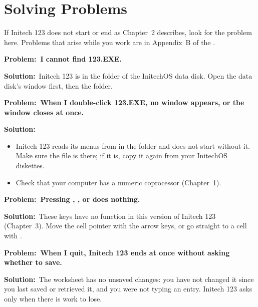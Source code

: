 \chapter{Solving Problems}
\newcommand\Problem[1]{\par\addvspace{8pt}\noindent\textbf{Problem:\ #1}\par\nobreak\vspace{2pt}}
\newcommand\Solution{\noindent\textbf{Solution:}\ }

If Initech 123 does not start or end as Chapter~2 describes, look for the problem
here.  Problems that arise while you work are in Appendix~B of the
.

\Problem{I cannot find 123.EXE.}
\Solution Initech 123 is in the folder  of the InitechOS data
disk.  Open the data disk's window first, then the folder.

\Problem{When I double-click 123.EXE, no window appears, or the window closes
at once.}
\Solution
\begin{itemize}
\item Initech 123 reads its menus from  in the 
  folder and does not start without it.  Make sure the file is there; if it
  is, copy it again from your InitechOS diskettes.
\item Check that your computer has a numeric coprocessor (Chapter~1).
\end{itemize}


\Problem{Pressing , ,  or  does
nothing.}
\Solution These keys have no function in this version of Initech 123
(Chapter~3).  Move the cell pointer with the arrow keys, or go straight to a
cell with .

\Problem{When I quit, Initech 123 ends at once without asking whether to
save.}
\Solution The worksheet has no unsaved changes: you have not changed it
since you last saved or retrieved it, and you were not typing an entry.
Initech 123 asks only when there is work to lose.


